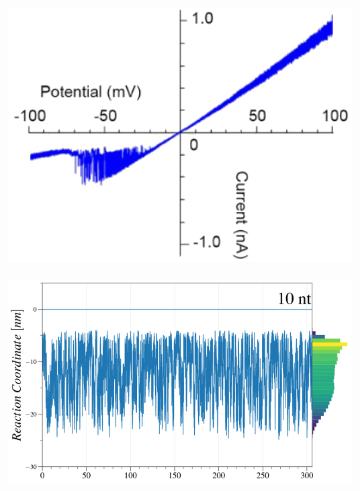 \begin{figure}[ht]
  \begin{centering}
  \hspace{.35cm}
  \begin{subfigure}[t]{\dimexpr.3\linewidth-1.3em\relax}
  \centering
  \vspace{0.2cm}
  \includegraphics[width=\linewidth,valign=t]{Figures/IV-90.png}
  \end{subfigure}%
  \hspace{.25cm}
  \begin{subfigure}[t]{\dimexpr.5\linewidth-1.3em\relax}
  \centering
  \includegraphics[width=\linewidth,valign=t]{Figures/MR-90.png}
  \end{subfigure}%
  \hspace{.3cm}
  \begin{subfigure}[t]{\dimexpr.21\linewidth-1.3em\relax}

\end{subfigure}
\end{centering}
\end{figure}
